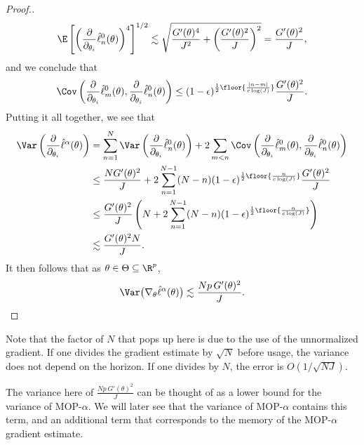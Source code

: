 \begin{proof}[Proof.]
\begin{equation}
\E\left[\left(\frac{\partial}{\partial_{\theta_i}}\hat\ell_n^0(\theta)\right)^4\right]^{1/2} \lesssim  \sqrt{\frac{G'(\theta)^4}{J^2}+\left(\frac{G'(\theta)^2}{J}\right)^2} = \frac{G'(\theta)^2}{J},
\end{equation}
and we conclude that 
\begin{equation}
\Cov\left(\frac{\partial}{\partial_{\theta_i}}\hat\ell_m^0(\theta), \frac{\partial}{\partial_{\theta_i}}\hat\ell_n^0(\theta)\right) \leq (1-\epsilon)^{\frac{1}{2}\floor{\frac{|n-m|}{c\log(J)}}}\frac{G'(\theta)^2}{J}.
\end{equation}
Putting it all together, we see that
\begin{align}
    \Var\left(\frac{\partial}{\partial_{\theta_i}} \hat\ell^\alpha(\theta)\right) &= \sum_{n=1}^N \Var\left(\frac{\partial}{\partial_{\theta_i}}\hat\ell_n^0(\theta)\right) + 2\sum_{m<n} \Cov\left(\frac{\partial}{\partial_{\theta_i}}\hat\ell_m^0(\theta),\frac{\partial}{\partial_{\theta_i}}\hat\ell_n^0(\theta)\right)\\
    &\leq \frac{NG'(\theta)^2}{J} + 2\sum_{n=1}^{N-1} (N-n)(1-\epsilon)^{\frac{1}{2}\floor{\frac{n}{c\log(J)}}}\frac{G'(\theta)^2}{J} \\
    &\leq \frac{G'(\theta)^2}{J} \left(N + 2\sum_{n=1}^{N-1} (N-n) (1-\epsilon)^{\frac{1}{2}\floor{\frac{n}{c\log(J)}}}\right) \\
    &\lesssim \frac{G'(\theta)^2N}{J}.
\end{align}
It then follows that as $\theta \in \Theta \subseteq \R^p$, 
\begin{equation}
    \Var\big(\nabla_{\theta} \hat\ell^\alpha(\theta)\big) \lesssim \frac{Np \, G'(\theta)^2}{J}.
\end{equation}
\end{proof}
Note that the factor of $N$ that pops up here is due to the use of the unnormalized gradient. If one divides the gradient estimate by $\sqrt{N}$ before usage, the variance does not depend on the horizon. If one divides by $N$, the error is $O(1/\sqrt{NJ})$.

The variance here of $\frac{Np \, G'(\theta)^2}{J}$ can be thought of as a lower bound for the variance of MOP-$\alpha$. We will later see that the variance of MOP-$\alpha$ contains this term, and an additional term that corresponds to the memory of the MOP-$\alpha$ gradient estimate.

